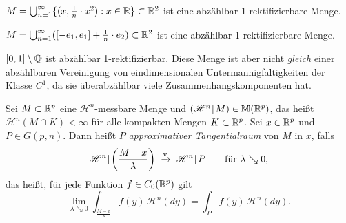 \documentclass[a4paper,twoside,DIV15,BCOR12mm]{scrbook}
\newcommand{\HM}{\mathscr H}
\newcommand{\downto}{\mathrel\searrow}
\newcommand{\MR}{\lfloor}
\begin{document}
\begin{beispiele}
\item $M = \bigcup_{n=1}^\infty \{(x,\frac 1n \cdot x^2) : x\in \mathbb{R}\} \subset \mathbb{R}^2$ ist eine abzählbar  1-rektifizierbare Menge.
\item $M = \bigcup_{n=1}^\infty ([-e_1, e_1] + \frac 1n \cdot e_2) \subset \mathbb{R}^2$ ist eine abzählbar 1-rektifizierbare Menge.
\item $[0,1]\setminus \mathbb{Q} $ ist abzählbar 1-rektifizierbar. Diese Menge ist aber nicht \emph{gleich} einer abzählbaren Vereinigung von eindimensionalen Untermannigfaltigkeiten der Klasse $C^1$, da sie überabzählbar viele Zusammenhangskomponenten hat.
\end{beispiele}

\begin{definition}
Sei $M\subset \mathbb{R}^p$ eine $\HM^n$-messbare Menge und $(\HM^n\MR M)\in \mathbb M(\MdR^p)$, das heißt $\HM^n(M\cap K) < \infty$ für alle kompakten Mengen $K\subset \mathbb{R}^p$. Sei $x\in\mathbb{R}^p$ und $P\in G(p,n)$. Dann heißt $P$ \emph{approximativer Tangentialraum} von $M$ in $x$, falls
\[
\HM^n\MR \left(\frac{M-x}{\lambda}\right) \tonach{v} \HM^n\MR P\qquad \text{für $\lambda \downto0$,}
\]
das heißt, für jede Funktion $f\in C_0(\mathbb{R}^p)$ gilt
\[
\lim_{\lambda \downto0} \int_{\frac{M-x}\lambda} f(y)\, \HM^n(dy) = \int_P f(y) \,\HM^n(dy).
\]
\end{definition}
\end{document}

